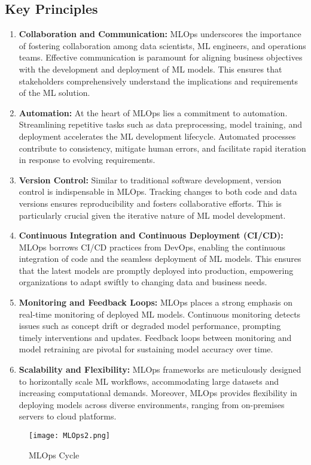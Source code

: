 \documentclass[12pt, letterpaper]{article}
\begin{document}
\subsection{Key Principles}
\begin{enumerate}

    \item \textbf{Collaboration and Communication:}
    MLOps underscores the importance of fostering collaboration among data scientists, ML engineers, and operations teams. Effective communication is paramount for aligning business objectives with the development and deployment of ML models. This ensures that stakeholders comprehensively understand the implications and requirements of the ML solution\cite{suescun2021devops}.

    \item \textbf{Automation:}
    At the heart of MLOps lies a commitment to automation. Streamlining repetitive tasks such as data preprocessing, model training, and deployment accelerates the ML development lifecycle. Automated processes contribute to consistency, mitigate human errors, and facilitate rapid iteration in response to evolving requirements\cite{suescun2021devops}.

    \item \textbf{Version Control:}
    Similar to traditional software development, version control is indispensable in MLOps. Tracking changes to both code and data versions ensures reproducibility and fosters collaborative efforts. This is particularly crucial given the iterative nature of ML model development\cite{sen2021devops}.

    \item \textbf{Continuous Integration and Continuous Deployment (CI/CD):}
    MLOps borrows CI/CD practices from DevOps, enabling the continuous integration of code and the seamless deployment of ML models. This ensures that the latest models are promptly deployed into production, empowering organizations to adapt swiftly to changing data and business needs\cite{karpanoja2016exploring}.

    \item \textbf{Monitoring and Feedback Loops:}
    MLOps places a strong emphasis on real-time monitoring of deployed ML models. Continuous monitoring detects issues such as concept drift or degraded model performance, prompting timely interventions and updates. Feedback loops between monitoring and model retraining are pivotal for sustaining model accuracy over time\cite{hasselbring2019industrial}.

    \item \textbf{Scalability and Flexibility:}
    MLOps frameworks are meticulously designed to horizontally scale ML workflows, accommodating large datasets and increasing computational demands. Moreover, MLOps provides flexibility in deploying models across diverse environments, ranging from on-premises servers to cloud platforms\cite{Rafi}.
\end{enumerate}
 \begin{figure}
    \centering
    \texttt{[image: MLOps2.png]}
    \caption{MLOps Cycle}
\end{figure}
\end{document}
